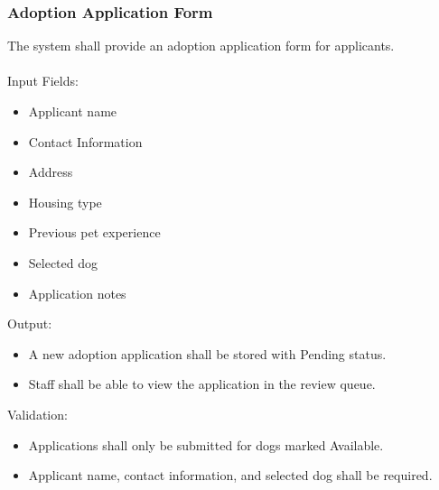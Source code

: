 \documentclass[12pt]{article}
\begin{document}
\subsubsection{Adoption Application Form}
The system shall provide an adoption application form for applicants.
\\
\\
Input Fields:
\begin{itemize}\item Applicant name\end{itemize}
\begin{itemize}\item Contact Information\end{itemize}
\begin{itemize}\item Address\end{itemize}
\begin{itemize}\item Housing type\end{itemize}
\begin{itemize}\item Previous pet experience\end{itemize}
\begin{itemize}\item Selected dog\end{itemize}
\begin{itemize}\item Application notes\end{itemize}
Output:
\begin{itemize}\item A new adoption application shall be stored with Pending status.\end{itemize}
\begin{itemize}\item Staff shall be able to view the application in the review queue.\end{itemize}
Validation:
\begin{itemize}\item Applications shall only be submitted for dogs marked Available.\end{itemize}
\begin{itemize}\item Applicant name, contact information, and selected dog shall be required.\end{itemize}
\end{document}
